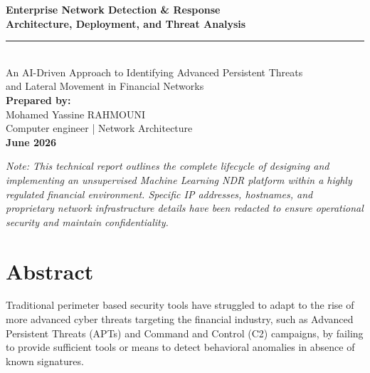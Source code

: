 \documentclass[12pt,a4paper]{report}
\begin{document}


\begin{titlepage}
    \centering
    \vspace*{3cm}

    {\Huge \textbf{Enterprise Network Detection \& Response}}\\[0.5cm]
    
    {\Large \textbf{Architecture, Deployment, and Threat Analysis}}\\[0.5cm]
    
    \rule{\textwidth}{1pt}\\[1.5cm] 

    {\Large An AI-Driven Approach to Identifying Advanced Persistent Threats\\[0.3cm] and Lateral Movement in Financial Networks}\\[3cm]

    {\Large \textbf{Prepared by:}}\\[0.2cm]
    {\Large Mohamed Yassine RAHMOUNI}\\[0.1cm]
    {\normalsize Computer engineer  | Network Architecture}\\[3cm]

    {\large \textbf{June 2026}}\\[2cm]

    \vfill
    
    \begin{minipage}{0.85\textwidth}
        \centering
        \small
        \textit{Note: This technical report outlines the complete lifecycle of designing and implementing an unsupervised Machine Learning NDR platform within a highly regulated financial environment. Specific IP addresses, hostnames, and proprietary network infrastructure details have been redacted to ensure operational security and maintain confidentiality.}
    \end{minipage}
    \vspace*{1cm}
\end{titlepage}






\chapter*{Abstract}
Traditional perimeter based security tools have struggled to adapt to the rise of more advanced cyber threats targeting the financial industry, such as Advanced Persistent Threats (APTs) and Command and Control (C2) campaigns, by failing to provide sufficient tools or means to detect behavioral anomalies in absence of known signatures.\\
\end{document}
